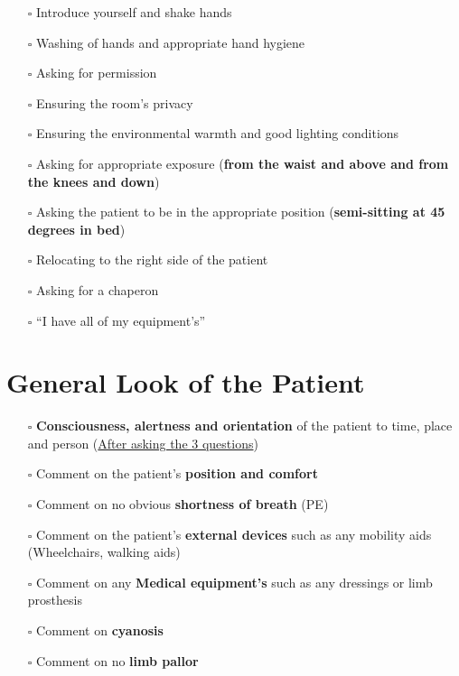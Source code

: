 \documentclass[
  13.5pt,
  a4paper,
  DIV=11,
  numbers=noendperiod]{scrreprt}
\providecommand{\tightlist}{%
  \setlength{\itemsep}{0pt}\setlength{\parskip}{0pt}}
\begin{document}
\begin{itemize}
\tightlist
\item[$\square$]
  Introduce yourself and shake hands\\
\item[$\square$]
  Washing of hands and appropriate hand hygiene\\
\item[$\square$]
  Asking for permission\\
\item[$\square$]
  Ensuring the room's privacy\\
\item[$\square$]
  Ensuring the environmental warmth and good lighting conditions\\
\item[$\square$]
  Asking for appropriate exposure (\textbf{from the waist and above and
  from the knees and down})\\
\item[$\square$]
  Asking the patient to be in the appropriate position
  (\textbf{semi-sitting at 45 degrees in bed})\\
\item[$\square$]
  Relocating to the right side of the patient\\
\item[$\square$]
  Asking for a chaperon\\
\item[$\square$]
  ``I have all of my equipment's''
\end{itemize}

\section{General Look of the
Patient}\label{general-look-of-the-patient-5}

\begin{itemize}
\tightlist
\item[$\square$]
  \textbf{Consciousness, alertness and orientation} of the patient to
  time, place and person (\href{miscellaneous.qmd}{After asking the 3
  questions})\\
\item[$\square$]
  Comment on the patient's \textbf{position and comfort}\\
\item[$\square$]
  Comment on no obvious \textbf{shortness of breath} (PE)\\
\item[$\square$]
  Comment on the patient's \textbf{external devices} such as any
  mobility aids (Wheelchairs, walking aids)\\
\item[$\square$]
  Comment on any \textbf{Medical equipment's} such as any dressings or
  limb prosthesis\\
\item[$\square$]
  Comment on \textbf{cyanosis}\\
\item[$\square$]
  Comment on no \textbf{limb pallor}
\end{itemize}
\end{document}
